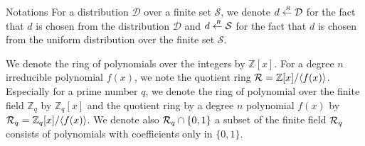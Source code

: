 \begin{subsection}{Notations}
  For a distribution $\mathcal{D}$ over a finite set $\mathcal{S}$,
  we denote $d \stackrel{{\scriptscriptstyle \mkern4mu R}}{\gets} \mathcal{D}$ for the fact that $d$ is chosen from the distribution $\mathcal{D}$ and
  $d \stackrel{{\scriptscriptstyle \mkern4mu R}}{\gets} \mathcal{S}$ for the fact that $d$ is chosen from the uniform distribution over the finite set $\mathcal{S}$.\

  We denote the ring of polynomials over the integers by $\mathbb{Z}[x]$.
  For a degree $n$ irreducible polynomial $f(x)$, we note the quotient ring ${\mathcal{R}} = \mathbb{Z}[x]/\langle f(x) \rangle$.
  Especially for a prime number $q$, we denote the ring of polynomial over the finite field $\mathbb{Z}_q$ by $\mathbb{Z}_q[x]$
  and the quotient ring by a degree $n$ polynomial $f(x)$ by ${\mathcal{R}}_q = \mathbb{Z}_q[x]/\langle f(x) \rangle$.
  We denote also ${\mathcal{R}}_q\cap \{0,1\}$ a subset of the finite field ${\mathcal{R}}_q$ consists of polynomials with coefficients only in $ \{0,1\}$.

\end{subsection}

